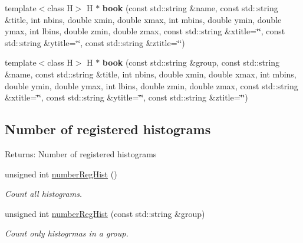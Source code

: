 \begin{CompactItemize}
\item 
\hypertarget{namespaceServices_1_1Histogramming_e3d75ad478e0bcd748f005b50ee05c65}{
template$<$class H$>$ H $\ast$ \textbf{book} (const std::string \&name, const std::string \&title, int nbins, double xmin, double xmax, int mbins, double ymin, double ymax, int lbins, double zmin, double zmax, const std::string \&xtitle=\char`\"{}\char`\"{}, const std::string \&ytitle=\char`\"{}\char`\"{}, const std::string \&ztitle=\char`\"{}\char`\"{})}
\label{namespaceServices_1_1Histogramming_e3d75ad478e0bcd748f005b50ee05c65}

\item 
\hypertarget{namespaceServices_1_1Histogramming_820f474ddba0749b33a9e17170e8234c}{
template$<$class H$>$ H $\ast$ \textbf{book} (const std::string \&group, const std::string \&name, const std::string \&title, int nbins, double xmin, double xmax, int mbins, double ymin, double ymax, int lbins, double zmin, double zmax, const std::string \&xtitle=\char`\"{}\char`\"{}, const std::string \&ytitle=\char`\"{}\char`\"{}, const std::string \&ztitle=\char`\"{}\char`\"{})}
\label{namespaceServices_1_1Histogramming_820f474ddba0749b33a9e17170e8234c}

\end{CompactItemize}
\subsection*{Number of registered histograms}
\begin{Desc}
\item[Returns:]Number of registered histograms \end{Desc}
\begin{CompactItemize}
\item 
\hypertarget{namespaceServices_1_1Histogramming_f24556ae612cc9283720d9e964265bd5}{
unsigned int \hyperlink{namespaceServices_1_1Histogramming_f24556ae612cc9283720d9e964265bd5}{number\-Reg\-Hist} ()}
\label{namespaceServices_1_1Histogramming_f24556ae612cc9283720d9e964265bd5}

\begin{CompactList}\small\item\em Count all histograms. \item\end{CompactList}\item 
unsigned int \hyperlink{namespaceServices_1_1Histogramming_4731840672ebd592faf176c87a187c72}{number\-Reg\-Hist} (const std::string \&group)
\begin{CompactList}\small\item\em Count only histogrmas in a group. \item\end{CompactList}\end{CompactItemize}
